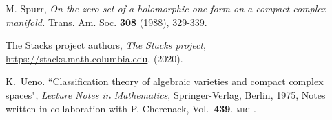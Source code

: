 \documentclass[a4paper,12pt,reqno]{amsart}
\theoremstyle{plain}
\theoremstyle{definition}
\theoremstyle{remark}
\begin{document}
\begin{thebibliography}{HKLR}
 M. Spurr, {\it On the zero set of a holomorphic one-form on a compact complex manifold.} Trans. Am.
Soc. \textbf{308} (1988), 329-339. 

 The {Stacks project authors}, \textit{The Stacks project}, \url{https://stacks.math.columbia.edu}, (2020).

 K.\ Ueno. ``Classification theory of algebraic varieties and compact complex spaces", \textit{Lecture Notes in Mathematics},
Springer-Verlag, Berlin, 1975, Notes written in collaboration with P. Cherenack, Vol.\ \textbf{439}. 
\textsc{mr}: \href{http://www.ams.org/mathscinet-getitem?mr=0506253}{}.


\end{thebibliography}
\end{document}
